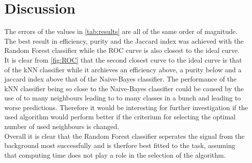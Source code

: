 \section{Discussion}\label{sec:Discussion}

The errors of the values in \autoref{tab:results} are all of the same order of magnitude.
The best result in efficiency, purity and the Jaccard index was achieved with the Random Forest classifier while the ROC curve
is also closest to the ideal curve. \\
It is clear from \autoref{fig:ROC} that the second closest curve to the ideal curve is that of the kNN classifier while
it archieves an efficiency above, a purity below and a jaccard index above that of the Naive-Bayes classifier.
The performance of the kNN classifier being so close to the Naive-Bayes classifier could be caused by the use of
to many neighbours leading to to many classes in a bunch and leading to worse predictions.
Therefore it would be interesting for further investigation if the used algorithm would perform better
if the criterium for selecting the optimal number of used neighbours is changed. \\
Overall it is clear that the Random Forest classifier seperates the signal from the background most successfully
and is therfore best fitted to the task, assuming that computing time does not play a role in the selection of the algorithm.
